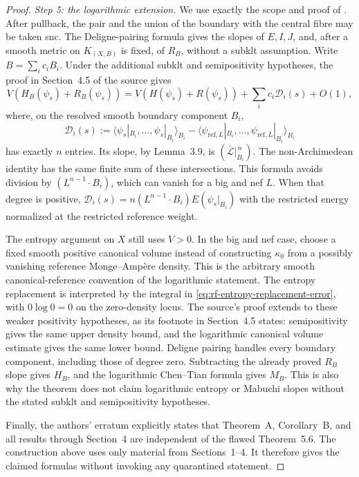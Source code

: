 \begin{proof}
\smallskip
\noindent\emph{Step 5: the logarithmic extension.}
We use exactly the scope and proof of \cite[Theorem~4.2]{BHJ19}.  After
pullback, the pair and the union of the boundary with the central fibre
may be taken snc.  The Deligne-pairing formula gives the slopes of
$E,I,J$, and, after a smooth metric on $K_{(X,B)}$ is fixed, of
$R_B$, without a subklt assumption.  Write
$B=\sum_i c_iB_i$.  Under the additional subklt and semipositivity
hypotheses, the proof in Section~4.5 of the source gives
\[
 V(H_B(\psi_s)+R_B(\psi_s))
   =V(H(\psi_s)+R(\psi_s))+\sum_i c_i\mathcal D_i(s)+O(1),
\]
where, on the resolved smooth boundary component $B_i$,
\[
 \mathcal D_i(s):=
 \langle\psi_s|_{B_i},\ldots,\psi_s|_{B_i}\rangle_{B_i}
 -\langle\psi_{\mathrm{ref},L}|_{B_i},\ldots,
             \psi_{\mathrm{ref},L}|_{B_i}\rangle_{B_i}
\tag{65.40a}\label{eq:rf-boundary-deligne-slope}
\]
has exactly $n$ entries. Its slope, by Lemma~3.9, is
$(\overline{\mathcal L}|_{\overline B_i}^{\,n})$.
The non-Archimedean identity has the same finite sum of these intersections.
This formula avoids division by $(L^{n-1}\!\cdot B_i)$, which can vanish
for a big and nef $L$. When that degree is positive,
$\mathcal D_i(s)=n(L^{n-1}\!\cdot B_i)E(\psi_s|_{B_i})$ with the
restricted energy normalized at the restricted reference weight.

The entropy argument on $X$ still uses $V>0$. In the big and nef case,
choose a fixed smooth positive canonical volume instead of constructing
$\kappa_0$ from a possibly vanishing reference Monge--Amp\`ere density.
This is the arbitrary smooth canonical-reference convention of the
logarithmic statement. The entropy replacement is interpreted by the
integral in \eqref{eq:rf-entropy-replacement-error}, with $0\log0=0$ on
the zero-density locus. The source's proof extends to these weaker
positivity hypotheses, as its footnote in Section~4.5 states:
semipositivity gives the same upper density bound, and the logarithmic
canonical volume estimate gives the same lower bound. Deligne pairing
handles every boundary component, including those of degree zero.
Subtracting the already proved $R_B$ slope gives $H_B$, and the logarithmic
Chen--Tian formula gives $M_B$. This is also why the theorem does not
claim logarithmic entropy or Mabuchi slopes without the stated subklt and
semipositivity hypotheses.

Finally, the authors' erratum \cite{BHJ19err} explicitly states that
Theorem~A, Corollary~B, and all results through Section~4 are independent
of the flawed Theorem~5.6.  The construction above uses only material from
Sections~1--4.  It therefore gives the claimed formulas without invoking
any quarantined statement.
\end{proof}

